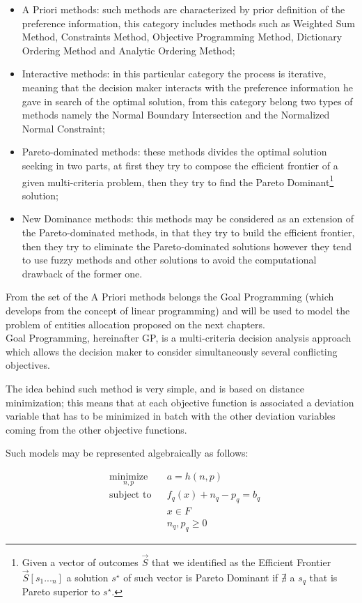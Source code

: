 \documentclass{article}
\begin{document}
\begin{itemize}
	\item A Priori methods: such methods are characterized by prior definition of the preference information, this category includes methods such as Weighted Sum Method, Constraints Method, Objective Programming Method, Dictionary Ordering Method and Analytic Ordering Method;   
	\item Interactive methods: in this particular category the process is iterative, meaning that the decision maker interacts with the preference information he gave in search of the optimal solution, from this category belong two types of methods namely the Normal Boundary Intersection and the Normalized Normal Constraint;
	\item Pareto-dominated methods: these methods divides the optimal solution seeking in two parts, at first they try to compose the efficient frontier of a given multi-criteria problem, then they try to find the Pareto Dominant\footnote{Given a vector of outcomes $\vec{S}$ that we identified as the Efficient Frontier $\vec{S}[s_1..._n]$ a solution $s^{\star}$ of such vector is Pareto Dominant if $\nexists$ a $s_q$ that is Pareto superior to $s^{\star}$.} solution;
	\item New Dominance methods: this methods may be considered as an extension of the Pareto-dominated methods, in that they try to build the efficient frontier, then they try to eliminate the Pareto-dominated solutions however they tend to use fuzzy methods and other solutions to avoid the computational drawback of the former one.  
\end{itemize}

From the set of the A Priori methods belongs the Goal Programming (which develops from the concept of linear programming) and will be used to model the problem of entities allocation proposed on the next chapters.
\\
Goal Programming, hereinafter GP, is a multi-criteria decision analysis approach which allows the decision maker to consider simultaneously several conflicting objectives.

The idea behind such method is very simple, and is based on distance minimization; this means that at each objective function is associated a deviation variable that has to be minimized in batch with the other deviation variables coming from the other objective functions.

Such models may be represented algebraically as follows:

\begin{equation*}
\begin{aligned}
& \underset{n,p}{\text{minimize}}
& & a=h(n,p) \\
& \text{subject to}
& & f_q(x)+n_q-p_q=b_q \\
& & & x\in F \\
& & & n_q,p_q\geq 0 
\end{aligned}
\end{equation*}
\end{document}
